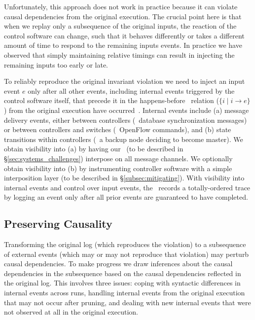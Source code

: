 Unfortunately, this approach does not work in practice because it can violate
causal dependencies from the original execution. The crucial point here is that when we replay only a
subsequence of the original inputs, the reaction of the control software
can change, such that it behaves differently or takes a different amount of
time to respond to the remaining inputs events.
In practice we have observed that simply maintaining relative timings can
result in injecting the remaining inputs too early or late.

To reliably reproduce the original invariant violation
we need to inject an input event $e$ only after all other
events, including internal events triggered by the control software itself,
that precede it in the
happens-before~\cite{Lamport:1978:TCO:359545.359563}
relation ($\{i \mid i \rightarrow e\}$) from the original execution have
occurred~\cite{tel2000introduction}. Internal events include
(a) message delivery events, either between controllers (\eg~database
synchronization messages) or
between controllers and switches (\eg~OpenFlow commands), and (b) state transitions
within controllers (\eg~a backup node deciding to become master).
We obtain visibility into (a) by having our
\tester~(to be described in \S\ref{sec:systems_challenges}) interpose on all message channels.
We optionally obtain visibility into (b) by instrumenting controller
software with a simple interposition layer (to be described in \S\ref{subsec:mitigating}).
With visibility into internal events and control over input events, the
\tester~records a totally-ordered trace by logging an event only after
all prior events are guaranteed to have completed.

\subsection{Preserving Causality}

Transforming the original log (which reproduces the violation)
to a subsequence of external events (which may or may not reproduce that
violation) may perturb causal dependencies.
To make progress we draw inferences about
the causal dependencies in the subsequence based on the causal
dependencies reflected in the original log.
This involves three issues: coping with syntactic differences in internal
events across runs,
handling internal events from the original
execution that may not occur after pruning, and dealing with new internal events that were not
observed at all in the original execution.


